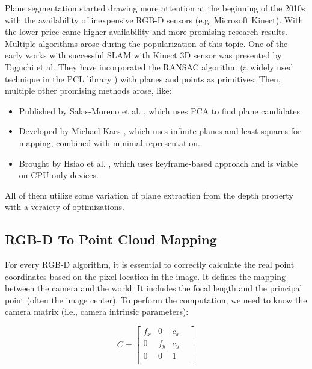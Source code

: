 Plane segmentation started drawing more attention at the beginning of the 2010s with the availability of inexpensive RGB-D sensors
(e.g. Microsoft Kinect). \cite{articleFPSLinePrimitivesRGBD}
With the lower price came higher availability and more promising research results.
Multiple algorithms arose during the popularization of this topic.
One of the early works with successful SLAM with Kinect 3D sensor
was presented by Taguchi et al. \cite{inproceedingsEarlySLAMWithRANSACWithKinectSensor}
They have incorporated the RANSAC \cite{articleRANSAC} algorithm
(a widely used technique in the PCL library \cite{inproceedingsPCL}) with planes and points as primitives.
Then, multiple other promising methods arose, like:
\begin{itemize}
\item Published by Salas-Moreno et al. \cite{inproceedingsPCAInSLAMToFindPlaneCandidates},
which uses PCA to find plane candidates
\item Developed by Michael Kaes \cite{articleSLAMInfinitePlanes},
which uses infinite planes and least-squares for mapping, combined with minimal representation.
\item Brought by Hsiao et al. \cite{inproceedingsKeyframeSLAM},
which uses keyframe-based approach and is viable on CPU-only devices.
\end{itemize}
All of them utilize some variation of plane extraction from the depth property with a veraiety of optimizations.

\subsection{RGB-D To Point Cloud Mapping} \label{subsection:rgb-to-pc-mapping}

For every RGB-D algorithm, it is essential to correctly calculate the real point coordinates
based on the pixel location in the image.
It defines the mapping between the camera and the world.
It includes the focal length and the principal point (often the image center).
To perform the computation, we need to know the camera matrix (i.e., camera intrinsic parameters):

\begin{equation} \label{equation-camera-matrix}
	C = \begin{bmatrix}
		f_x &   0 & c_x & \\
		  0 & f_y & c_y & \\
		  0 &   0 &   1 & \\
	\end{bmatrix}
\end{equation}


